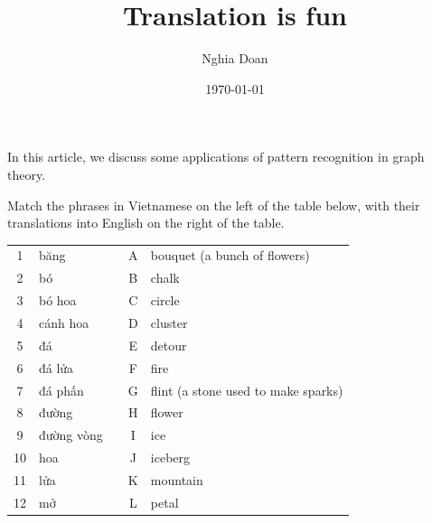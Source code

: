 \documentclass{article}
\title{Translation is fun}
\author{Nghia Doan}
\date{\today}
\begin{document}
\maketitle

In this article, we discuss some applications of pattern recognition in graph theory.

\begin{example*}
    
    Match the phrases in Vietnamese on the left of the table below,
    with their translations into English on the right of the table.

\begin{otherlanguage}{vietnamese}

    \begin{center}
        \begin{tabular}{|c|l|c|c|l|}
            \cline{1-2} \cline{4-5}
            1  & băng       &  & A & bouquet (a bunch of flowers)        \\ \cline{1-2} \cline{4-5} 
            2  & bó         &  & B & chalk                               \\ \cline{1-2} \cline{4-5} 
            3  & bó hoa     &  & C & circle                              \\ \cline{1-2} \cline{4-5} 
            4  & cánh hoa   &  & D & cluster                             \\ \cline{1-2} \cline{4-5} 
            5  & đá         &  & E & detour                              \\ \cline{1-2} \cline{4-5} 
            6  & đá lửa     &  & F & fire                                \\ \cline{1-2} \cline{4-5} 
            7  & đá phấn    &  & G & flint (a stone used to make sparks) \\ \cline{1-2} \cline{4-5} 
            8  & đường      &  & H & flower                              \\ \cline{1-2} \cline{4-5} 
            9  & đường vòng &  & I & ice                                 \\ \cline{1-2} \cline{4-5} 
            10 & hoa        &  & J & iceberg                             \\ \cline{1-2} \cline{4-5} 
            11 & lửa        &  & K & mountain                            \\ \cline{1-2} \cline{4-5} 
            12 & mở         &  & L & petal                               \\ \cline{1-2} \cline{4-5} 

\end{tabular}
\end{center}
\end{otherlanguage}
\end{example*}
\end{document}
